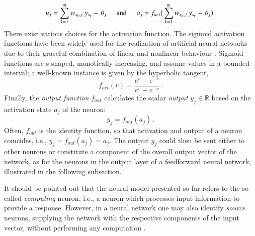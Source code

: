 \documentclass[longtitle]{elsarticle}
\numberwithin{equation}{section}
\theoremstyle{theorem}
\theoremstyle{definition}
\theoremstyle{remark}
\theoremstyle{proposition}
\numberwithin{figure}{section}
\begin{document}
		\begin{equation*}
			u_j = \sum_{k = 1}^m w_{s_k,j} ~ y_{s_k} - \, \theta_j \hspace*{0.5cm} \text{and} \hspace*{0.5cm} a_j = f_{act} \big( \sum_{k = 1}^m w_{s_k,j} ~ y_{s_k} - \, \theta_j \big) \, .
		\end{equation*}
		There exist various choices for the activation function. The sigmoid activation functions have been widely used for the realization of artificial neural networks due to their graceful combination of linear and nonlinear behaviour \cite{Hay05}. Sigmoid functions are s-shaped, monotically increasing, and assume values in a bounded interval; a well-known instance is given by the hyperbolic tangent,
		\begin{equation*}
			f_{act}(v) = \dfrac{e^{v} - e^{-v}}{e^v + e^{-v}} \, .
		\end{equation*}
		Finally, the \emph{output function} $f_{out}$ calculates the scalar \emph{output} $y_j \in \mathbb{R}$ based on the activation state $a_j$ of the neuron:
		\begin{equation*}
			y_j = f_{out}(a_j) \, .
		\end{equation*}
		Often, $f_{out}$ is the identity function, so that activation and output of a neuron coincides, i.e., $y_j = f_{out}(a_j) = a_j$. The output $y_j$ could then be sent either to other neurons or constitute a component of the overall output vector of the network, as for the neurons in the output layer of a feedforward neural network, illustrated in the following subsection.
		
		It should be pointed out that the neural model presented so far refers to the so called \emph{computing} neuron, i.e., a neuron which processes input information to provide a response. However, in a neural network one may also identify \emph{source} neurons, supplying the network with the respective components of the input vector, without performing any computation \cite{Hay05}.
		
\end{document}
